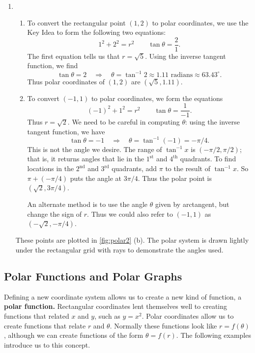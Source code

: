 \begin{example}
\begin{enumerate}
	\item \begin{enumerate}
		\item To convert the rectangular point $(1,2)$ to polar coordinates, we use the Key Idea to form the following two equations:
		\[1^2+2^2 = r^2 \qquad \tan \theta = \frac{2}{1}.\]
		The first equation tells us that $r=\sqrt{5}$. Using the inverse tangent function, we find
		\[\tan \theta = 2 \quad \Rightarrow \quad \theta = \tan^{-1} 2 \approx 1.11\text{ radians}\approx 63.43^\circ.\]
		Thus polar coordinates of $(1,2)$ are $(\sqrt{5},1.11)$.
		\item		To convert $(-1,1)$ to polar coordinates, we form the equations 
		\[(-1)^2+1^2=r^2 \qquad \tan \theta = \frac{1}{-1}.\]
		Thus $r=\sqrt{2}$. We need to be careful in computing $\theta$: using the inverse tangent function, we have
		\[\tan\theta = -1 \quad \Rightarrow \quad \theta = \tan^{-1}(-1) = -\pi/4.\]
		This is not the angle we desire. The range of $\tan^{-1}x $ is $(-\pi/2,\pi/2)$; that is, it returns angles that lie in the $1^\text{st}$ and $4^\text{th}$ quadrants. To find locations in the $2^\text{nd}$  and $3^\text{rd}$ quadrants, add $\pi$ to the result of $\tan^{-1}x$. So  $\pi+(-\pi/4)$ puts the angle at $3\pi/4$. Thus the polar point is $(\sqrt{2},3\pi/4)$.
		
		An alternate method is to use the angle $\theta$ given by arctangent, but change the sign of $r$. Thus we could also refer to $(-1,1)$ as\\ $(-\sqrt{2},-\pi/4)$.
	\end{enumerate}
These points are plotted in \autoref{fig:polar2} (b). The polar system is drawn lightly under the rectangular grid with rays to demonstrate the angles used.
\end{enumerate}
\end{example}

\subsection{Polar Functions and Polar Graphs}

Defining a new coordinate system allows us to create a new kind of function, a \textbf{polar function.} Rectangular coordinates lent themselves well to creating functions that related $x$ and $y$, such as $y=x^2$. Polar coordinates allow us to create functions that relate $r$ and $\theta$. Normally these functions look like $r=f(\theta)$, although we can create functions of the form $\theta = f(r)$. The following examples introduce us to this concept.

